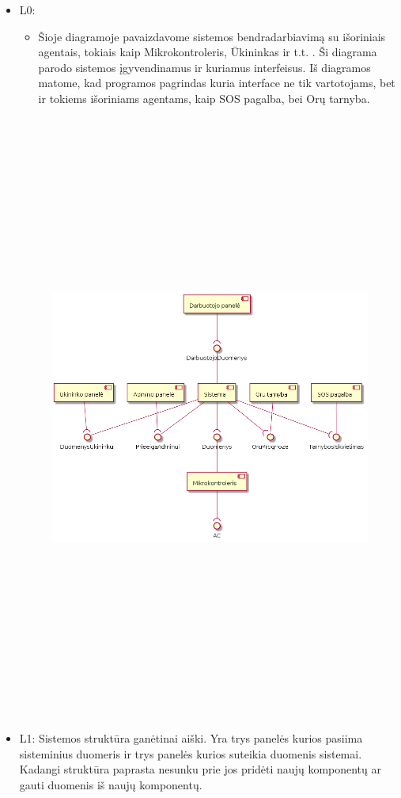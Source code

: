 \documentclass[oneside]{VUMIFPSkursinis}
\begin{document}
	\begin{itemize}
	\item L0:
	\begin{itemize}
	\item Šioje diagramoje pavaizdavome sistemos bendradarbiavimą su išoriniais agentais, tokiais kaip Mikrokontroleris, Ūkininkas ir t.t. . Ši diagrama parodo sistemos įgyvendinamus ir kuriamus interfeisus. Iš diagramos matome, kad programos pagrindas kuria interface ne tik vartotojams, bet ir tokiems išoriniams agentams, kaip SOS pagalba, bei Orų tarnyba.
\end{itemize}
	\begin{figure}[H]
		\centering	
	\includegraphics[width=17cm,height=20cm,keepaspectratio]{L1V2.png}
	\caption{}
	\label{fig:L1V2}
\end{figure}
\item L1: Sistemos struktūra ganėtinai aiški. Yra trys panelės kurios pasiima sisteminius duomeris ir trys panelės kurios suteikia duomenis sistemai. Kadangi struktūra paprasta nesunku prie jos pridėti naujų komponentų ar gauti duomenis iš naujų komponentų.



\end{itemize}
\end{document}
